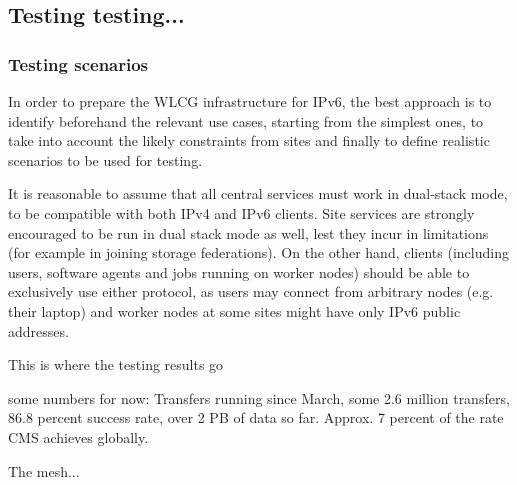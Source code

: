 \subsection{Testing testing...}

\subsubsection{Testing scenarios}
In order to prepare the WLCG infrastructure for IPv6, the best
approach is to identify beforehand the relevant use cases, starting
from the simplest ones, to take into account the likely constraints
from sites and finally to define realistic scenarios to be used for
testing.

It is reasonable to assume that all central services must work in
dual-stack mode, to be compatible with both IPv4 and IPv6
clients. Site services are strongly encouraged to be run in dual stack
mode as well, lest they incur in limitations (for example in joining
storage federations). On the other hand, clients (including users,
software agents and jobs running on worker nodes) should be able to
exclusively use either protocol, as users may connect from arbitrary
nodes (e.g. their laptop) and worker nodes at some sites might have
only IPv6 public addresses.



This is where the testing results go

some numbers for now: Transfers running since March, some 2.6 million transfers, 86.8 percent success
rate, over 2 PB of data so far. Approx. 7 percent of the rate CMS achieves globally.

The mesh...

